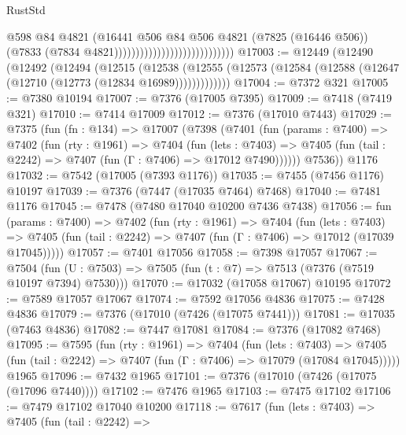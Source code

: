 \begin{lexlean}{RustStd}
\begin{coremodule}
                                                      @598
                                                      @84
                                                      @4821
                                                      (@16441
                                                        @506
                                                        @84
                                                        @506
                                                        @4821
                                                        (@7825 (@16446 @506))
                                                        (@7833
                                                          (@7834 @4821))))))))))))))))))))))))))))
@17003 := @12449
    (@12490
      (@12492
        (@12494
          (@12515
            (@12538
              (@12555 (@12573 (@12584 (@12588 (@12647 (@12710 (@12773 (@12834 @16989)))))))))))))
@17004 := @7372 @321
@17005 := @7380 @10194
@17007 := @7376 (@17005 @7395)
@17009 := @7418 (@7419 @321)
@17010 := @7414 @17009
@17012 := @7376 (@17010 @7443)
@17029 := @7375
    (fun (fn : @134) =>
    @17007
      (@7398
        (@7401
          (fun (params : @7400) =>
          @7402
            (fun (rty : @1961) =>
            @7404
              (fun (lets : @7403) =>
              @7405 (fun (tail : @2242) => @7407 (fun (Γ : @7406) => @17012 @7490))))))
        @7536))
    @1176
@17032 := @7542 (@17005 (@7393 @1176))
@17035 := @7455 (@7456 @1176) @10197
@17039 := @7376 (@7447 (@17035 @7464) @7468)
@17040 := @7481 @1176
@17045 := @7478 (@7480 @17040 @10200 @7436 @7438)
@17056 := fun (params : @7400) =>
  @7402
    (fun (rty : @1961) =>
    @7404
      (fun (lets : @7403) =>
      @7405 (fun (tail : @2242) => @7407 (fun (Γ : @7406) => @17012 (@17039 @17045)))))
@17057 := @7401 @17056
@17058 := @7398 @17057
@17067 := @7504
    (fun (U : @7503) => @7505 (fun (t : @7) => @7513 (@7376 (@7519 @10197 @7394) @7530)))
@17070 := @17032 (@17058 @17067) @10195
@17072 := @7589 @17057 @17067
@17074 := @7592 @17056 @4836
@17075 := @7428 @4836
@17079 := @7376 (@17010 (@7426 (@17075 @7441)))
@17081 := @17035 (@7463 @4836)
@17082 := @7447 @17081
@17084 := @7376 (@17082 @7468)
@17095 := @7595
    (fun (rty : @1961) =>
    @7404
      (fun (lets : @7403) =>
      @7405 (fun (tail : @2242) => @7407 (fun (Γ : @7406) => @17079 (@17084 @17045)))))
    @1965
@17096 := @7432 @1965
@17101 := @7376 (@17010 (@7426 (@17075 (@17096 @7440))))
@17102 := @7476 @1965
@17103 := @7475 @17102
@17106 := @7479 @17102 @17040 @10200
@17118 := @7617
    (fun (lets : @7403) =>
    @7405
      (fun (tail : @2242) =>

\end{coremodule}
\end{lexlean}
